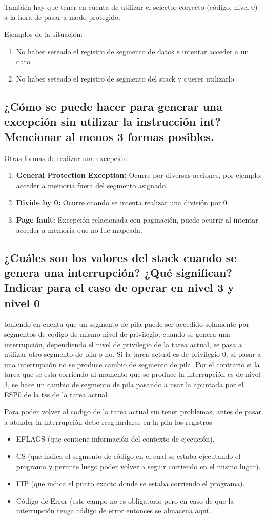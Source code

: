 \documentclass[a4paper,10pt,twoside]{article}
\begin{document}
También hay que tener en cuenta de utilizar el selector correcto (código, nivel 0) a la hora de pasar a modo protegido.

Ejemplos de la situación:
\begin{enumerate}
	\item No haber seteado el registro de segmento de datos e intentar acceder a un dato
	\item No haber seteado el registro de segmento del stack y querer utilizarlo
\end{enumerate}

\subsection{¿Cómo se puede hacer para generar una excepción sin utilizar la instrucción int? Mencionar al menos 3 formas posibles.}
Otras formas de realizar una excepción:
\begin{enumerate}
	\item \textbf{General Protection Exception:}
	Ocurre por diversas acciones, por ejemplo, acceder a memoria fuera del segmento asignado.
	\item \textbf{Divide by 0:}
	Ocurre cuando se intenta realizar una división por 0.
	\item \textbf{Page fault:}
	Excepción relacionada con paginación, puede ocurrir al intentar acceder a memoria que no fue mapeada.
\end{enumerate}

\subsection{¿Cuáles son los valores del stack cuando se genera una interrupción? ¿Qué significan? Indicar para el caso de operar en nivel 3 y nivel 0}
teniendo en cuenta que un segmento de pila puede ser accedido solamente por segmentos de codigo de mismo nivel de privilegio, cuando se genera una interrupción, dependiendo el nivel de privilegio de la tarea actual, se pasa a utilizar otro segmento de pila o no. Si la tarea actual es de privilegio 0, al pasar a una interrupción no se produce cambio de segmento de pila. Por el contrario si la tarea que se esta corriendo al momento que se produce la interrupción es de nivel 3, se hace un cambio de segmento de pila pasando a usar la apuntada por el ESP0 de la tss de la tarea actual.

Para poder volver al codigo de la tarea actual sin tener problemas, antes de pasar a atender la interrupción debe resguardarse en la pila los registros
\begin{itemize}
 \item EFLAGS (que contiene información del contexto de ejecución).
 \item CS (que indica el segmento de código en el cual se estaba ejecutando el programa y permite luego poder volver a seguir corriendo en el mismo lugar).
 \item EIP (que indica el punto exacto donde se estaba corriendo el programa).
 \item Código de Error (este campo no es obligatorio pero en caso de que la interrupción tenga código de error entonces se almacena aquí.
\end{itemize}
\end{document}
